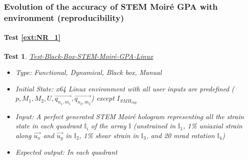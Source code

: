 \documentclass[12pt, titlepage]{article}
\newcommand{\progname}{STEM Moir{\'e} GPA}
\newtheorem{Test}{Test}
\begin{document}
\subsubsection{Evolution of the accuracy of \progname{} with environment (reproducibility)}

\paragraph{Test \cref{ext:NR_1}}						

\begin{Test}\normalfont\underline{Test-Black-Box-STEM-Moir{\'e}-GPA-Linux}
\label{black_box_STEM_Moire_GPA-predif-Linux}
\begin{itemize}
\item Type: Functional, Dynamical, Black box, Manual
\item Initial State: x64 Linux environment with all user inputs are predefined ($p,M_1,M_2,U,\overrightarrow{q_{n_1,m_1}},\overrightarrow{q_{n_2,m_2}}$) except $I_{\mathit{SMH}_\text{exp}}$ 
\item Input: A perfect generated STEM Moir{\'e} hologram representing all the strain state in each quadrant $\mathbb{I}_{i}$ of the array $\mathbb{I}$ (unstrained in $\mathbb{I}_{1}$, 1{\%} uniaxial strain along $\vec{u_x}$ and $\vec{u_y}$ in $\mathbb{I}_{2}$, 1{\%} shear strain in $\mathbb{I}_{3}$, and  20 mrad rotation $\mathbb{I}_{4}$)
\item Expected output: In each quadrant
\end{itemize}
\end{Test}
\end{document}
